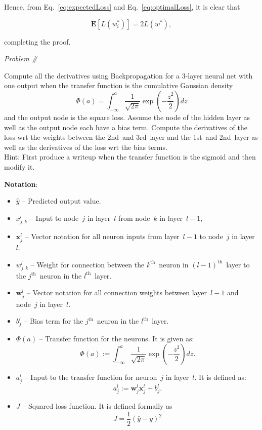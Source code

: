 \documentclass{report}
\newcounter{problemCount}
\newenvironment{problemshell}{
  \par%
  \medskip
  \leftskip=0pt\rightskip=0pt%
}
{
  \par\medskip
}
\newenvironment{problem}
{%
  \stepcounter{problemCount}
  \begin{problemshell}
    \noindent \textit{Problem \#\arabic{problemCount}} \\
    \bfseries  
}
{
  \end{problemshell}
}
\newcommand{\problemspace}{\\[0.4em]}
\newcommand{\w}{\mathbf{w}}
\newcommand{\xvec}{\mathbf{x}}
\newcommand{\yhat}{\hat{y}}
\begin{document}
  Hence, from Eq.~\eqref{eq:expectedLoss} and Eq.~\eqref{eq:optimalLoss}, it is clear that 
  
  \[\mathbf{E}[L(w_{i}^{*})] = 2L(w^{*}), \]
  
  \noindent
  completing the proof.

  \newpage
  \begin{problem}
    Compute all the derivatives using Backpropagation for a 3-layer neural net with one output when the transfer function is the cumulative Gaussian density
    \[\Phi(a) = \int_{-\infty}^{a}\frac{1}{\sqrt{2\pi}} \exp\left( -\frac{z^2}{2}\right) dz\]
    \noindent
    and the output node is the square loss.  Assume the node of the hidden layer as well as the output node each have a bias term.  Compute the derivatives of the loss wrt the weights between the 2nd~and 3rd~layer and the 1st~and 2nd~layer as well as the derivatives of the loss wrt the bias terms.
    \problemspace
    Hint: First produce a writeup when the transfer function is the sigmoid and then modify it.
  \end{problem}

  \textbf{Notation}: 
  \begin{itemize}
    \item $\yhat$ -- Predicted output value.
    \item $x_{j,k}^{l}$ -- Input to node~$j$ in layer~$l$ from node~$k$ in layer~$l-1$,
    \item $\xvec_{j}^{l}$ -- Vector notation for all neuron inputs from layer~$l-1$ to node~$j$ in layer~$l$.
    \item $w_{j,k}^{l}$ -- Weight for connection between the ${k^{\text{th}}}$~neuron in ${(l-1)^{\text{th}}}$~layer to the ${j^{\text{th}}}$~neuron in the ${l^{\text{th}}}$~layer.
    \item $\w_{j}^{l}$ -- Vector notation for all connection weights between layer~$l-1$ and node~$j$ in layer~$l$.
    \item $b_{j}^{l}$ -- Bias term for the ${j^{\text{th}}}$~neuron in the $l^{\text{th}}$~layer.
    \item $\Phi(a)$ -- Transfer function for the neurons.  It is given as:
    \begin{equation}
      \Phi(a) :=\int_{-\infty}^{a}\frac{1}{\sqrt{2\pi}} \exp\left( -\frac{z^{2}}{2} \right)dz\label{eq:transferFunction} \textrm{.}
    \end{equation}
    \item $a_{j}^{l}$ -- Input to the transfer function for neuron~$j$ in layer~$l$.  It is defined as:
    \begin{equation}
      a_{j}^{l} := \w_{j}^{l} \xvec_{j}^{l} + b_{j}^{l}\textrm{.}
    \end{equation}
    \item $J$ -- Squared loss function.  It is defined formally as 
    \begin{equation}
      J = \frac{1}{2} (\yhat -y)^2
    \end{equation}
  \end{itemize}
  
\end{document}
